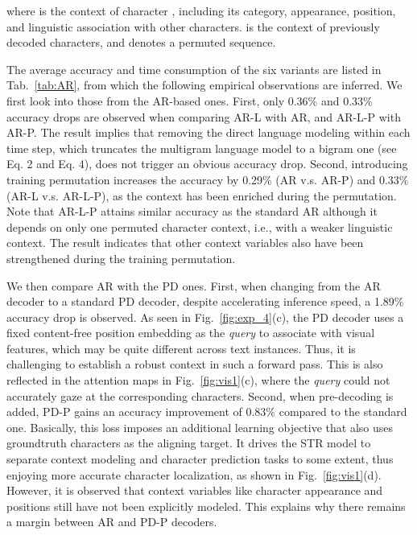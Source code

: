 \documentclass[10pt,journal,compsoc]{IEEEtran}
\begin{document}
\noindent where  is the context of character , including its category, appearance, position, and linguistic association with other characters.  is the context of previously decoded  characters, and  denotes a permuted sequence.


\begin{table}[t]\footnotesize
\caption{Results of the six decoder
variants.}
\centering
{}

\label{tab:AR}
\end{table}


The average accuracy and time consumption of the six variants are listed in Tab.~\ref{tab:AR}, from which the following empirical observations are inferred. We first look into those from the AR-based ones. First, only 0.36\% and 0.33\% accuracy drops are observed when comparing AR-L with AR, and AR-L-P with AR-P. The result implies that removing the direct language modeling within each time step, which truncates the multigram language model to a bigram one (see Eq. 2 and Eq. 4), does not trigger an obvious accuracy drop. Second, introducing training permutation increases the accuracy by 0.29\% (AR v.s. AR-P) and 0.33\% (AR-L v.s. AR-L-P), as the context has been enriched during the permutation. Note that AR-L-P attains similar accuracy as the standard AR although it depends on only one permuted character context, i.e., with a weaker linguistic context. The result indicates that other context variables also have been strengthened during the training permutation.

We then compare AR with the PD ones. First, when changing from the AR decoder to a standard PD decoder, despite accelerating inference speed, a 1.89\% accuracy drop is observed. As seen in Fig.~\ref{fig:exp_4}(c), the PD decoder uses a fixed content-free position embedding as the \emph{query} to associate with visual features, which may be quite different across text instances. Thus, it is challenging to establish a robust context in such a forward pass. This is also reflected in the attention maps in Fig.~\ref{fig:vis1}(c), where the \emph{query} could not accurately gaze at the corresponding characters. Second, when pre-decoding is added, PD-P gains an accuracy improvement of 0.83\% compared to the standard one. Basically, this loss imposes an additional learning objective that also uses groundtruth characters as the aligning target. It drives the STR model to separate context modeling and character prediction tasks to some extent, thus enjoying more accurate character localization, as shown in Fig.~\ref{fig:vis1}(d). However, it is observed that context variables like character appearance and positions still have not been explicitly modeled. This explains why there remains a margin between AR and PD-P decoders.
\end{document}
